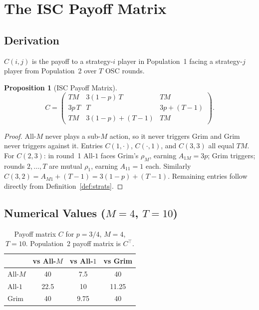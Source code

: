\documentclass[12pt,a4paper]{article}
\newtheorem{proposition}{Proposition}[section]
\begin{document}
\section{The ISC Payoff Matrix}
\label{sec:C}

\subsection{Derivation}

$C(i,j)$ is the payoff to a strategy-$i$ player in Population~1 facing a
strategy-$j$ player from Population~2 over $T$ OSC rounds.

\begin{proposition}[ISC Payoff Matrix]\label{prop:C}
\begin{equation}\label{eq:C}
C = \begin{pmatrix}
T M & 3(1-p)\,T & T M \\[4pt]
3p\,T & T & 3p+(T-1) \\[4pt]
T M & 3(1-p)+(T-1) & T M
\end{pmatrix}.
\end{equation}
\end{proposition}

\begin{proof}
All-$M$ never plays a sub-$M$ action, so it never triggers Grim and Grim never
triggers against it.  Entries $C(1,\cdot)$, $C(\cdot,1)$, and $C(3,3)$ all
equal $TM$.  For $C(2,3)$: in round~1 All-$1$ faces Grim's $\rho_M$, earning
$A_{1M}=3p$; Grim triggers; rounds $2,\ldots,T$ are mutual $\rho_1$, earning
$A_{11}=1$ each.  Similarly $C(3,2)=A_{M1}+(T-1)=3(1-p)+(T-1)$.  Remaining
entries follow directly from Definition~\ref{def:strats}.
\end{proof}

\subsection{Numerical Values ($M=4$, $T=10$)}

\begin{table}[H]
\centering
\caption{Payoff matrix $C$ for $p=3/4$, $M=4$, $T=10$.
         Population~2 payoff matrix is $C^\top$.}
\label{tab:C_p075}
\renewcommand{\arraystretch}{1.2}
\begin{tabular}{lccc}
\toprule
           & vs All-$M$ & vs All-$1$ & vs Grim \\
\midrule
All-$M$    & 40 & 7.5  & 40    \\
All-$1$    & 22.5 & 10 & 11.25 \\
Grim       & 40 & 9.75 & 40    \\
\bottomrule
\end{tabular}
\end{table}
\end{document}
